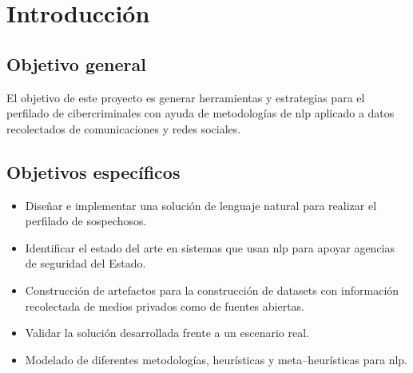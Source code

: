 \chapter{Introducción} %

\label{chIntroduction} %


\section{Objetivo general}
El objetivo de este proyecto es generar herramientas y estrategias para el perfilado de cibercriminales con ayuda de metodologías de \gls{nlp} aplicado a datos recolectados de comunicaciones y redes sociales.

\section{Objetivos específicos}
\begin{itemize}
  
\item Diseñar e implementar una solución de lenguaje natural para realizar el perfilado de sospechosos.

\item Identificar el estado del arte en sistemas que usan \gls{nlp} para apoyar agencias de seguridad del Estado.

\item Construcción de artefactos para la construcción de \gls{dataset}s con información recolectada de medios privados como de fuentes abiertas.

\item Validar la solución desarrollada frente a un escenario real.

\item Modelado de diferentes metodologías, heurísticas y meta--heurísticas para \gls{nlp}.

\end{itemize}
